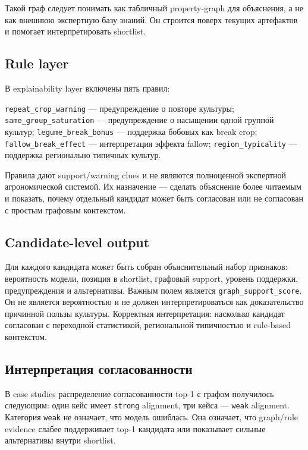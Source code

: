\documentclass[a4paper,article,14pt]{extarticle}
\begin{document}
Такой граф следует понимать как табличный property-graph для объяснения, а не как внешнюю экспертную базу знаний. Он строится поверх текущих артефактов и помогает интерпретировать shortlist.

\subsection{Rule layer}

В explainability layer включены пять правил:
\begin{itemize}
    \ITEM \texttt{repeat\_crop\_warning} --- предупреждение о повторе культуры;
    \ITEM \texttt{same\_group\_saturation} --- предупреждение о насыщении одной группой культур;
    \ITEM \texttt{legume\_break\_bonus} --- поддержка бобовых как break crop;
    \ITEM \texttt{fallow\_break\_effect} --- интерпретация эффекта fallow;
    \ITEM \texttt{region\_typicality} --- поддержка регионально типичных культур.
\end{itemize}

Правила дают support/warning clues и не являются полноценной экспертной агрономической системой. Их назначение --- сделать объяснение более читаемым и показать, почему отдельный кандидат может быть согласован или не согласован с простым графовым контекстом.

\subsection{Candidate-level output}

Для каждого кандидата может быть собран объяснительный набор признаков: вероятность модели, позиция в shortlist, графовый support, уровень поддержки, предупреждения и альтернативы. Важным полем является \texttt{graph\_support\_score}. Он не является вероятностью и не должен интерпретироваться как доказательство причинной пользы культуры. Корректная интерпретация: насколько кандидат согласован с переходной статистикой, региональной типичностью и rule-based контекстом.

\subsection{Интерпретация согласованности}

В case studies распределение согласованности top-1 с графом получилось следующим: один кейс имеет \texttt{strong} alignment, три кейса --- \texttt{weak} alignment. Категория \texttt{weak} не означает, что модель ошиблась. Она означает, что graph/rule evidence слабее поддерживает top-1 кандидата или показывает сильные альтернативы внутри shortlist.
\end{document}
